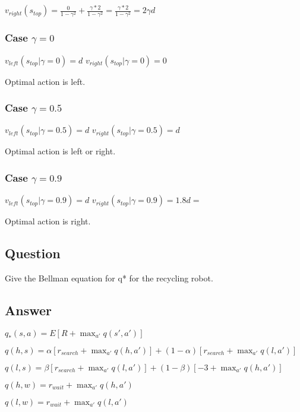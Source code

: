 \documentclass[11pt]{article}
\begin{document}
    $ v_{right}(s_{top}) = \frac{0}{1-\gamma^{2}} + \frac{\gamma * 2}{1-\gamma^{2}} = \frac{\gamma * 2}{1-\gamma^{2}} = 2 \gamma d $

    \subsubsection*{Case $\gamma=0$}

    $ v_{left}(s_{top} | \gamma=0) = d $
    $ v_{right}(s_{top} | \gamma=0) = 0 $

    Optimal action is left.


    \subsubsection*{Case $\gamma=0.5$}

    $ v_{left}(s_{top} | \gamma=0.5) = d $
    $ v_{right}(s_{top} | \gamma=0.5) = d $

    Optimal action is left or right.

    \subsubsection*{Case $\gamma=0.9$}

    $ v_{left}(s_{top} | \gamma=0.9) = d $
    $ v_{right}(s_{top} | \gamma=0.9) = 1.8d =  $

    Optimal action is right.

    \subsection{Question}

    Give the Bellman equation for q* for the recycling robot.

    \subsection*{Answer}

    $ q_{*}(s, a) = E[R + \max_{a'} q(s',a') ] $

    $ q(h, s) = \alpha [r_{search} + \max_{a'} q(h,a')] + (1-\alpha) [r_{search} + \max_{a'} q(l,a') ]  $

    $ q(l, s) = \beta [r_{search} + \max_{a'} q(l,a')] + (1-\beta) [-3 + \max_{a'} q(h,a') ]  $

    $ q(h, w) = r_{wait} + \max_{a'} q(h,a') $

    $ q(l, w) = r_{wait} + \max_{a'} q(l,a') $
\end{document}
